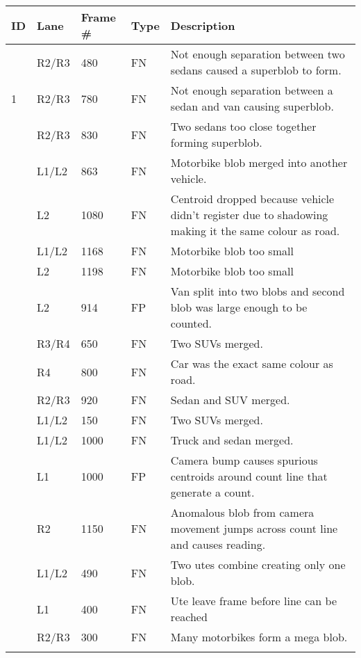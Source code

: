 \begin{table}[H]
    \centering
    \begin{tabular}{|p{1cm}p{1cm}p{1cm}p{1cm}p{10cm}|} 
    \hline
    \textbf{ID} & \textbf{Lane} & \textbf{Frame \#} & \textbf{Type} & \textbf{Description}\\
    \hline
    \multirow{3}{1em}{1}  
    &R2/R3&480&FN&Not enough separation between two sedans caused a superblob to form.\\\cline{2-5}
    &R2/R3&780&FN&Not enough separation between a sedan and van causing superblob.\\\cline{2-5}
    &R2/R3&830&FN&Two sedans too close together forming superblob.\\\Xhline{1pt}

    \multirow{5}{1em}{2}  
    &L1/L2&863&FN&Motorbike blob merged into another vehicle.\\\cline{2-5}
    &L2&1080&FN&Centroid dropped because vehicle didn't register due to shadowing making it the same colour as road.\\\cline{2-5}
    &L1/L2&1168&FN&Motorbike blob too small\\\cline{2-5}
    &L2&1198&FN&Motorbike blob too small\\\cline{2-5}
    &L2&914&FP&Van split into two blobs and second blob was large enough to be counted.\\\Xhline{1pt}

    \multirow{7}{1em}{3}  
    &R3/R4&650&FN&Two SUVs merged.\\\cline{2-5}
    &R4&800&FN&Car was the exact same colour as road.\\\cline{2-5}
    &R2/R3&920&FN&Sedan and SUV merged.\\\cline{2-5}
    &L1/L2&150&FN&Two SUVs merged.\\\cline{2-5}
    &L1/L2&1000&FN&Truck and sedan merged.\\\cline{2-5}
    &L1&1000&FP&Camera bump causes spurious centroids around count line that generate a count.\\\cline{2-5}
    &R2&1150&FN&Anomalous blob from camera movement jumps across count line and causes reading.\\\Xhline{1pt}

    \multirow{3}{1em}{4}  
    &L1/L2&490&FN&Two utes combine creating only one blob.\\\cline{2-5}
    &L1&400&FN&Ute leave frame before line can be reached\\\cline{2-5}
    &R2/R3&300&FN&Many motorbikes form a mega blob.\\\Xhline{1pt}


\end{tabular}
\end{table}
